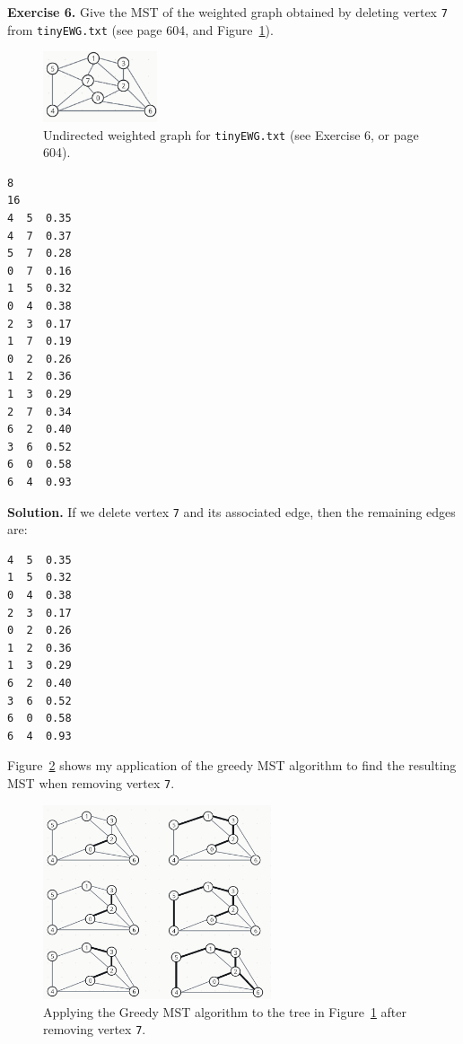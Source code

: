 \documentclass[12pt, a4paper]{article}
\newenvironment{ex}[2][Exercise]
{\par\medskip\noindent \textbf{#1 #2.}}
{\medskip}
\newenvironment{sol}[1][Solution]
{\par\medskip\noindent \textbf{#1.} }
{\medskip}
\begin{document}
	\begin{ex}{6}
		Give the MST of the weighted graph obtained by deleting vertex \texttt{7} from
		\texttt{tinyEWG.txt} (see page 604, and Figure~\ref{fig:ex-06}).
		\begin{figure}
			\centering
			\includegraphics[width=0.3\textwidth]{exercise-06}
			\caption{Undirected weighted graph for \texttt{tinyEWG.txt} (see Exercise 6,
				or page 604).}
			\label{fig:ex-06}
		\end{figure}
		\begin{lstlisting}[language={}]
8
16
4  5  0.35
4  7  0.37
5  7  0.28
0  7  0.16
1  5  0.32
0  4  0.38
2  3  0.17
1  7  0.19
0  2  0.26
1  2  0.36
1  3  0.29
2  7  0.34
6  2  0.40
3  6  0.52
6  0  0.58
6  4  0.93
		\end{lstlisting}
	\end{ex}
	\begin{sol}
		If we delete vertex \texttt{7} and its associated edge, then the remaining
		edges are:
		\begin{lstlisting}[language={}]
4  5  0.35
1  5  0.32
0  4  0.38
2  3  0.17
0  2  0.26
1  2  0.36
1  3  0.29
6  2  0.40
3  6  0.52
6  0  0.58
6  4  0.93
		\end{lstlisting}
		Figure~\ref{fig:ex-06-sol} shows my application of the greedy MST algorithm
		to find the resulting MST when removing vertex \texttt{7}.
		\begin{figure}
			\centering
			\includegraphics[width=0.6\textwidth]{exercise-06-solution}
			\caption{Applying the Greedy MST algorithm to the tree in Figure~\ref{fig:ex-06}
			after removing vertex \texttt{7}.}
			\label{fig:ex-06-sol}
		\end{figure}
	\end{sol}
\end{document}
